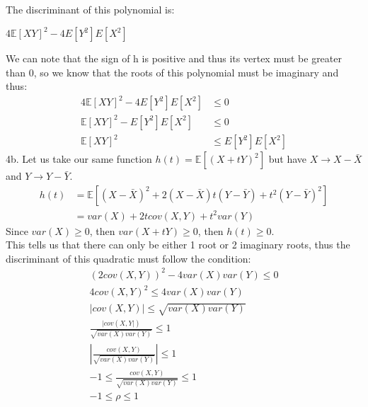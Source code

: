\documentclass[12pt]{article}
\begin{document}
The discriminant of this polynomial is:
\begin{center}
$4\mathbb{E}[XY]^2 - 4E[Y^2]E[X^2]$
\end{center}
We can note that the sign of h is positive and thus its vertex must be greater than 0, so we know that the roots of this polynomial must be imaginary and thus:
\begin{align} \nonumber
4\mathbb{E}[XY]^2 - 4E[Y^2]E[X^2] &\leq 0 \\ \nonumber
\mathbb{E}[XY]^2 - E[Y^2]E[X^2] &\leq 0 \\ \nonumber
\mathbb{E}[XY]^2 &\leq E[Y^2]E[X^2]
\end{align}
\newpage
4b. Let us take our same function $h(t) =\mathbb{E}[(X+tY)^2]$ but have $X \rightarrow X - \bar{X}$ and $Y \rightarrow Y - \bar{Y}$.
\begin{align} \nonumber
h(t) &= \mathbb{E}[(X-\bar{X})^2+2(X-\bar{X})t(Y-\bar{Y})+t^2(Y-\bar{Y})^2] \\ \nonumber
&= var(X) + 2tcov(X,Y) + t^2var(Y)
\end{align}
Since $var(X) \geq 0$, then $var(X+tY) \geq 0$, then $h(t) \geq 0$.\\
This tells us that there can only be either 1 root or 2 imaginary roots, thus the discriminant of this quadratic must follow the condition:
\begin{align} \nonumber
(2cov(X,Y))^2 - 4var(X)var(Y) \leq 0 \\ \nonumber
4cov(X,Y)^2 \leq 4var(X)var(Y) \\ \nonumber
|cov(X,Y)| \leq \sqrt{var(X)var(Y)} \\ \nonumber
\frac{|cov(X,Y|)}{\sqrt{var(X)var(Y)}} \leq 1 \\ \nonumber
|\frac{cov(X,Y)}{\sqrt{var(X)var(Y)}}| \leq 1 \\ \nonumber
-1 \leq \frac{cov(X,Y)}{\sqrt{var(X)var(Y)}} \leq 1 \\ \nonumber
-1 \leq \rho \leq 1
\end{align}
\end{document}
